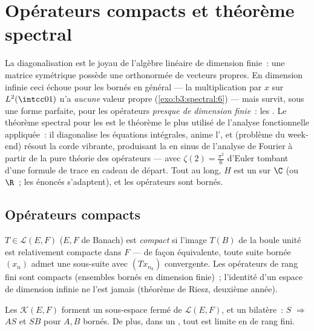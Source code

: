 \chapter{Opérateurs compacts et théorème spectral}
\label{ch:b3:spectral}

La diagonalisation est le joyau de l'algèbre linéaire de
dimension finie~: une matrice symétrique possède une 
orthonormée de vecteurs propres. En dimension infinie ceci
échoue pour les  bornés en général ---
la multiplication par $x$ sur $L^2(\intcc01)$ n'a
\emph{aucune} valeur propre (\cref{exo:b3:spectral:6}) ---
mais survit, sous une forme parfaite, pour les opérateurs
\emph{presque de dimension finie}~: les . Le théorème
spectral pour les   est le
théorème le plus utilisé de l'analyse fonctionnelle
appliquée~: il diagonalise les équations intégrales, anime
l', et (problème du week-end) résout
la corde vibrante, produisant la  en sinus de l'analyse
de Fourier à partir de la pure théorie des opérateurs ---
avec $\zeta(2) = \frac{\pi^2}6$ d'Euler tombant d'une
formule de trace en cadeau de départ. Tout au long, $H$ est
un  sur $\C$ (ou $\R$~; les énoncés
s'adaptent), et les opérateurs sont bornés.

\section{Opérateurs compacts}

\begin{definition}\label{def:b3:spectral:compact}
$T \in \mathcal L(E, F)$ ($E, F$ de Banach) est
\emph{compact} si l'image $T(B)$ de
la boule unité est relativement compacte dans $F$ --- de
façon équivalente, toute suite bornée $(x_n)$ admet une
sous-suite avec $(Tx_{n_k})$ convergente. Les opérateurs de
rang fini sont compacts (ensembles bornés en dimension
finie)~; l'identité d'un espace de dimension infinie ne
l'est jamais (théorème de Riesz, deuxième année).
\end{definition}

\begin{proposition}\label{prop:b3:spectral:ideal}
Les  $\mathcal K(E, F)$ forment un
sous-espace fermé de $\mathcal L(E, F)$, et un 
bilatère~: $S$  $\Rightarrow$ $AS$ et $SB$ 
pour $A, B$ bornés. De plus, dans un , tout
 est limite en  de rang
fini.
\end{proposition}

